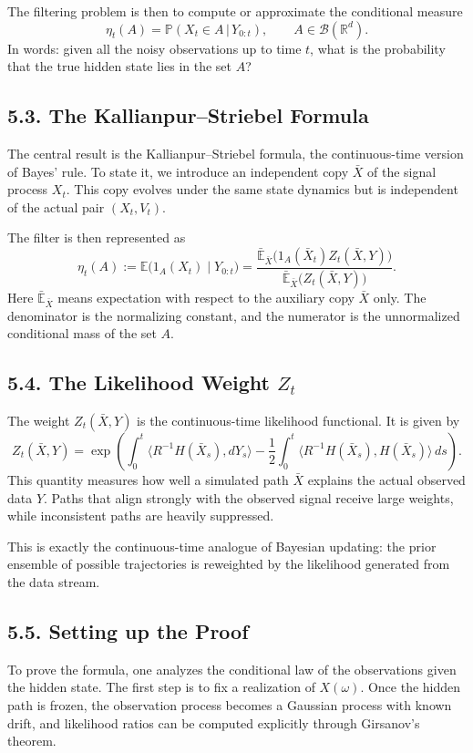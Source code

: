 \documentclass[11pt]{article}
\theoremstyle{definition}
\theoremstyle{remark}
\begin{document}
The filtering problem is then to compute or approximate the conditional measure
\[
\eta_t(A)=\mathbb P(X_t\in A\,|\,Y_{0:t}),
\qquad
A\in\mathcal B(\mathbb R^d).
\]
In words: given all the noisy observations up to time \(t\), what is the probability that the true hidden state lies in the set \(A\)?

\subsection*{5.3. The Kallianpur--Striebel Formula}
The central result is the Kallianpur--Striebel formula, the continuous-time version of Bayes' rule. To state it, we introduce an independent copy \(\bar X\) of the signal process \(X_t\). This copy evolves under the same state dynamics but is independent of the actual pair \((X_t,V_t)\).

The filter is then represented as
\[
\eta_t(A)
:=
\mathbb E\bigl(1_A(X_t)\mid Y_{0:t}\bigr)
=
\frac{\bar{\mathbb E}_{\bar X}\bigl(1_A(\bar X_t)Z_t(\bar X,Y)\bigr)}
{\bar{\mathbb E}_{\bar X}\bigl(Z_t(\bar X,Y)\bigr)}.
\]
Here \(\bar{\mathbb E}_{\bar X}\) means expectation with respect to the auxiliary copy \(\bar X\) only. The denominator is the normalizing constant, and the numerator is the unnormalized conditional mass of the set \(A\).

\subsection*{5.4. The Likelihood Weight \(Z_t\)}
The weight \(Z_t(\bar X,Y)\) is the continuous-time likelihood functional. It is given by
\[
Z_t(\bar X,Y)
=
\exp\left(
\int_0^t \langle R^{-1}H(\bar X_s),dY_s\rangle
-\frac12
\int_0^t \langle R^{-1}H(\bar X_s),H(\bar X_s)\rangle\,ds
\right).
\]
This quantity measures how well a simulated path \(\bar X\) explains the actual observed data \(Y\). Paths that align strongly with the observed signal receive large weights, while inconsistent paths are heavily suppressed.

This is exactly the continuous-time analogue of Bayesian updating: the prior ensemble of possible trajectories is reweighted by the likelihood generated from the data stream.

\subsection*{5.5. Setting up the Proof}
To prove the formula, one analyzes the conditional law of the observations given the hidden state. The first step is to fix a realization of \(X(\omega)\). Once the hidden path is frozen, the observation process becomes a Gaussian process with known drift, and likelihood ratios can be computed explicitly through Girsanov's theorem.
\end{document}
